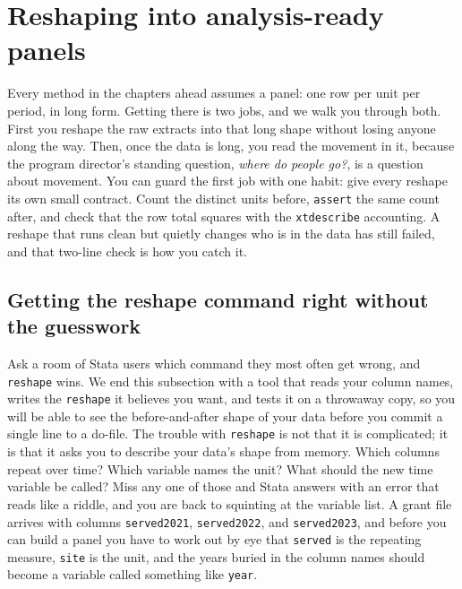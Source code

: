 \documentclass[
    a4paper,
    fontsize=10pt,
    twoside=true,
    numbers=noenddot,
]{kaobook}
\begin{document}
\section{Reshaping into analysis-ready panels}
Every method in the chapters ahead assumes a panel: one row per unit per period, in long form. Getting there is two jobs, and we walk you through both. First you reshape the raw extracts into that long shape without losing anyone along the way. Then, once the data is long, you read the movement in it, because the program director's standing question, \emph{where do people go?}, is a question about movement. You can guard the first job with one habit: give every reshape its own small contract. Count the distinct units before, \texttt{assert} the same count after, and check that the row total squares with the \texttt{xtdescribe} accounting. A reshape that runs clean but quietly changes who is in the data has still failed, and that two-line check is how you catch it.

\subsection{Getting the reshape command right without the guesswork}\label{sec:ch06-reshapehelper}
Ask a room of Stata users which command they most often get wrong, and \texttt{reshape} wins. We end this subsection with a tool that reads your column names, writes the \texttt{reshape} it believes you want, and tests it on a throwaway copy, so you will be able to see the before-and-after shape of your data before you commit a single line to a do-file. The trouble with \texttt{reshape} is not that it is complicated; it is that it asks you to describe your data's shape from memory. Which columns repeat over time? Which variable names the unit? What should the new time variable be called? Miss any one of those and Stata answers with an error that reads like a riddle, and you are back to squinting at the variable list. A grant file arrives with columns \texttt{served2021}, \texttt{served2022}, and \texttt{served2023}, and before you can build a panel you have to work out by eye that \texttt{served} is the repeating measure, \texttt{site} is the unit, and the years buried in the column names should become a variable called something like \texttt{year}.
\end{document}
